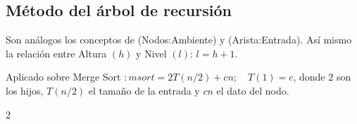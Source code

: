 \subsection{Método del árbol de recursión}
\begin{example}
	Son análogos los conceptos de (Nodos:Ambiente) y (Arista:Entrada). Así mismo la relación entre Altura $(h)$ y Nivel $(l)$: $l=h+1$.

	Aplicado sobre Merge Sort $:msort=2T(n/2)+cn;\quad T(1)=c$, donde $2$ son los hijos, $T(n/2)$ el tamaño de la entrada y $cn$ el dato del nodo.





	\begin{multicols}{2}



\end{multicols}
\end{example}
